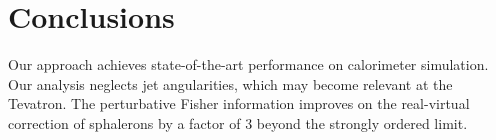 \section{Conclusions}\label{sec:conclusions}

Our approach achieves state-of-the-art performance on calorimeter
simulation. Our analysis neglects jet angularities, which may become
relevant at the Tevatron. The perturbative Fisher information improves
on the real-virtual correction of sphalerons by a factor of 3 beyond the
strongly ordered limit.

